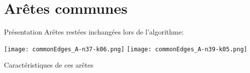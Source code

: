 \documentclass{beamer}
\begin{document}
\section{Arêtes communes}

\begin{frame}{Présentation}
Arêtes restées inchangées lors de l'algorithme:

\begin{center}
\texttt{[image: commonEdges\_A-n37-k06.png]}
\texttt{[image: commonEdges\_A-n39-k05.png]}
\end{center}

\end{frame}

\begin{frame}{Caractéristiques de ces arêtes}

\end{frame}
\end{document}
